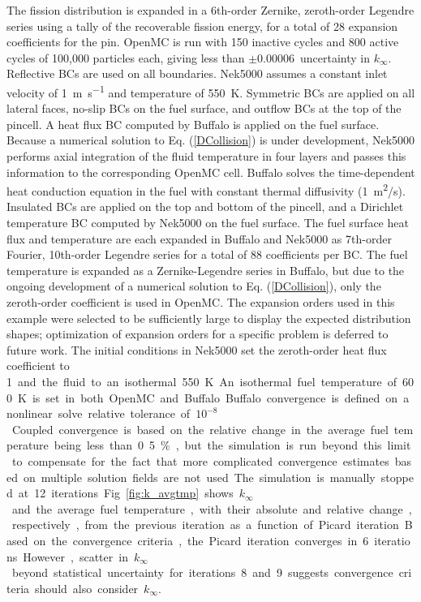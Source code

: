 \documentclass[letterpaper]{physor2018}
\begin{document}
The fission distribution is expanded in a 6th-order Zernike, zeroth-order
Legendre series using a tally of the recoverable fission energy,
for a total of 28 expansion coefficients for the pin.
OpenMC is run with 150 inactive
cycles and 800 active cycles of 100,000 particles each, giving less than \(\pm0.00006\)\
uncertainty in \(k_{\infty}\). Reflective BCs are used on all boundaries.
Nek5000 assumes a constant inlet velocity of \SI{1}{\meter\per\second} and temperature of \SI{550}{\kelvin}.
Symmetric BCs are applied on all lateral faces, no-slip
BCs on the fuel surface, and outflow BCs at the top of the pincell.
A heat flux BC computed by Buffalo is applied on the fuel surface.
Because a numerical solution to Eq. (\ref{DCollision}) is under development,
Nek5000 performs axial integration of the fluid temperature in
four layers and passes this information to the corresponding OpenMC cell.
Buffalo solves the time-dependent
heat conduction equation in the fuel with constant thermal diffusivity (\SI{1}{\meter^2/\second}).
Insulated BCs are applied on the top and bottom of
the pincell, and a Dirichlet temperature BC computed by Nek5000
on the fuel surface. The fuel surface heat flux and temperature are each expanded in
Buffalo and Nek5000 as 7th-order Fourier, 10th-order Legendre series for a total of 88
coefficients per BC. The fuel temperature
is expanded as a Zernike-Legendre series in Buffalo, but due to the ongoing
development of a numerical solution to Eq. (\ref{DCollision}), only the zeroth-order
coefficient is used in OpenMC.
The expansion orders used in this example were selected to be sufficiently large
to display the expected distribution shapes; optimization of expansion orders
for a specific problem is deferred to future work.
The initial conditions in Nek5000 set the zeroth-order heat flux
coefficient to \SI{1} and the fluid to an isothermal \SI{550}{\kelvin}. An isothermal fuel
temperature of \SI{600}{\kelvin} is set in both OpenMC and Buffalo.
Buffalo convergence is defined on a nonlinear solve relative tolerance of
\(10^{-8}\).
Coupled convergence is based on the relative change in the average fuel temperature being
less than 0.5\%, but the simulation is run beyond this limit to compensate for the
fact that more complicated convergence estimates based on multiple solution fields
are not used. The simulation is manually stopped at 12 iterations.
Fig.~\ref{fig:k_avgtmp}
shows \(k_{\infty}\) and the average fuel temperature, with their absolute
and relative change, respectively, from the previous iteration as a function of Picard iteration.
Based on the convergence criteria, the Picard iteration converges in
6 iterations. However, scatter in \(k_{\infty}\)
beyond statistical uncertainty for iterations 8 and 9 suggests
convergence criteria should also consider \(k_{\infty}\).
\end{document}
